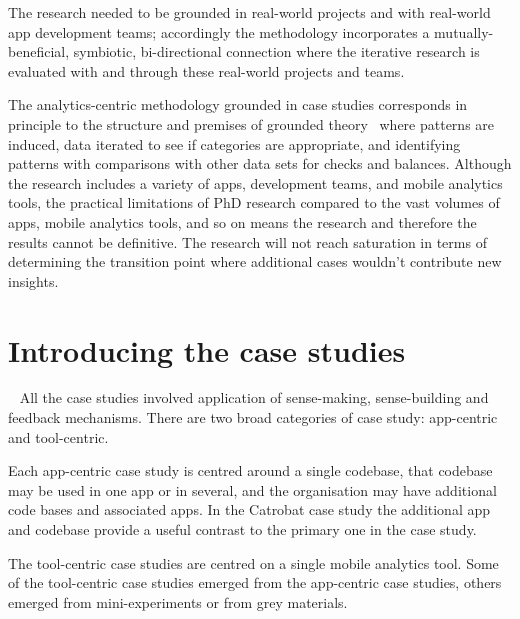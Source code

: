 The research needed to be grounded in real-world projects and with real-world app development teams; accordingly the methodology incorporates a mutually-beneficial, symbiotic, bi-directional connection where the iterative research is evaluated with and through these real-world projects and teams. 

The analytics-centric methodology grounded in case studies corresponds in principle to the structure and premises of grounded theory~ where patterns are induced, data iterated to see if categories are appropriate, and identifying patterns with comparisons with other data sets for checks and balances. Although the research includes a variety of apps, development teams, and mobile analytics tools, the practical limitations of PhD research compared to the vast volumes of apps, mobile analytics tools, and so on means the research and therefore the results cannot be definitive. The research will not reach saturation in terms of determining the transition point where additional cases wouldn't contribute new insights.


\section{Introducing the case studies}~\label{section-introducing-the-case-studies}
All the case studies involved application of sense-making, sense-building and feedback mechanisms. There are two broad categories of case study: app-centric and tool-centric. 

Each app-centric case study is centred around a single codebase, that codebase may be used in one app or in several, and the organisation may have additional code bases and associated apps. In the Catrobat case study the additional app and codebase provide a useful contrast to the primary one in the case study.

The tool-centric case studies are centred on a single mobile analytics tool. Some of the tool-centric case studies emerged from the app-centric case studies, others emerged from mini-experiments or from grey materials.

